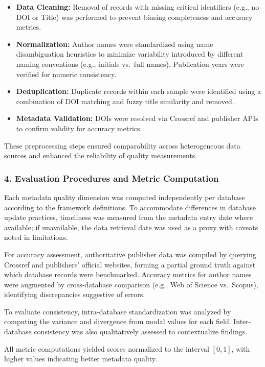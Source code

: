 \documentclass[
  12pt,
]{article}
\begin{document}
\begin{itemize}
\item
  \textbf{Data Cleaning:} Removal of records with missing critical
  identifiers (e.g., no DOI or Title) was performed to prevent biasing
  completeness and accuracy metrics.
\item
  \textbf{Normalization:} Author names were standardized using name
  disambiguation heuristics to minimize variability introduced by
  different naming conventions (e.g., initials vs.~full names).
  Publication years were verified for numeric consistency.
\item
  \textbf{Deduplication:} Duplicate records within each sample were
  identified using a combination of DOI matching and fuzzy title
  similarity and removed.
\item
  \textbf{Metadata Validation:} DOIs were resolved via Crossref and
  publisher APIs to confirm validity for accuracy metrics.
\end{itemize}

These preprocessing steps ensured comparability across heterogeneous
data sources and enhanced the reliability of quality measurements.

\subsubsection{4. Evaluation Procedures and Metric
Computation}\label{evaluation-procedures-and-metric-computation}

Each metadata quality dimension was computed independently per database
according to the framework definitions. To accommodate differences in
database update practices, timeliness was measured from the metadata
entry date where available; if unavailable, the data retrieval date was
used as a proxy with caveats noted in limitations.

For accuracy assessment, authoritative publisher data was compiled by
querying Crossref and publishers' official websites, forming a partial
ground truth against which database records were benchmarked. Accuracy
metrics for author names were augmented by cross-database comparison
(e.g., Web of Science vs.~Scopus), identifying discrepancies suggestive
of errors.

To evaluate consistency, intra-database standardization was analyzed by
computing the variance and divergence from modal values for each field.
Inter-database consistency was also qualitatively assessed to
contextualize findings.

All metric computations yielded scores normalized to the interval
\([0,1]\), with higher values indicating better metadata quality.
\end{document}
